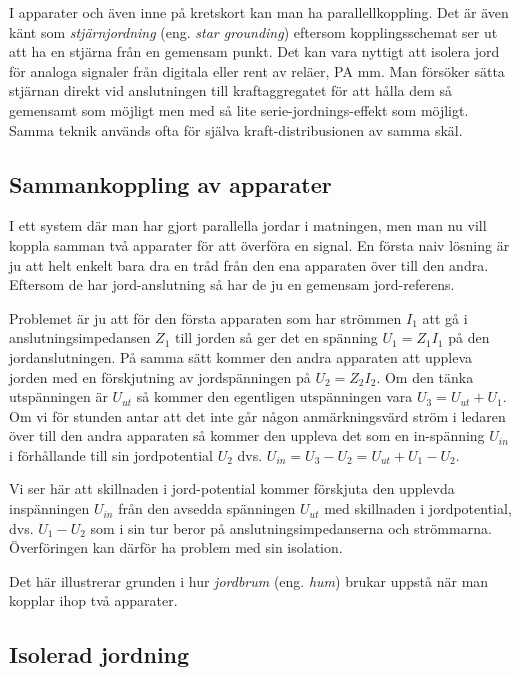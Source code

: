 I apparater och även inne på kretskort kan man ha parallellkoppling. Det är även
känt som \emph{stjärnjordning} (eng. \emph{star grounding}) eftersom
kopplingsschemat ser ut att ha en stjärna från en gemensam punkt. Det kan vara
nyttigt att isolera jord för analoga signaler från digitala eller rent av
reläer, PA mm. Man försöker sätta stjärnan direkt vid anslutningen till
kraftaggregatet för att hålla dem så gemensamt som möjligt men med så lite
serie-jordnings-effekt som möjligt. Samma teknik används ofta för själva
kraft-distribusionen av samma skäl.

\subsection{Sammankoppling av apparater}
\label{sammankopplingavapparater}

I ett system där man har gjort parallella jordar i matningen,
men man nu vill koppla samman två apparater för att överföra en signal.
En första naiv lösning är ju att helt enkelt bara dra en tråd från den ena
apparaten över till den andra. Eftersom de har jord-anslutning så har de ju en
gemensam jord-referens.

Problemet är ju att för den första apparaten som har strömmen \(I_1\) att gå i
anslutningsimpedansen \(Z_1\) till jorden så ger det en spänning
\(U_1 = Z_1 I_1\) på den jordanslutningen. På samma sätt kommer den
andra apparaten att uppleva jorden med en förskjutning av jordspänningen på
\(U_2 = Z_2 I_2\). Om den tänka utspänningen är \(U_{ut}\) så kommer den
egentligen utspänningen vara \(U_3 = U_{ut} + U_1\). Om vi för stunden antar att
det inte går någon anmärkningsvärd ström i ledaren över till den andra
apparaten så kommer den uppleva det som en in-spänning \(U_{in}\) i förhållande
till sin jordpotential \(U_2\) dvs. \(U_{in} = U_3 - U_2 = U_{ut} + U_1 - U_2\).

Vi ser här att skillnaden i jord-potential kommer förskjuta den upplevda
inspänningen \(U_{in}\) från den avsedda spänningen \(U_{ut}\) med skillnaden i
jordpotential, dvs. \(U_1 - U_2\) som i sin tur beror på anslutningsimpedanserna
och strömmarna. Överföringen kan därför ha problem med sin isolation.

Det här illustrerar grunden i hur \emph{jordbrum} (eng. \emph{hum}) brukar
uppstå när man kopplar ihop två apparater.

\subsection{Isolerad jordning}


